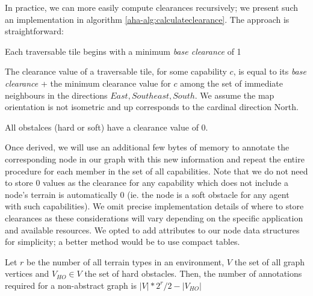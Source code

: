 
In practice, we can more easily compute clearances recursively; we present such an implementation in algorithm \ref{aha-alg:calculateclearance}. The approach is straightforward:  
\begin{definition}
Each traversable tile begins with a minimum \emph{base clearance} of 1
\end{definition}

\begin{definition}
The clearance value of a traversable tile, for some capability $c$, is equal to its \emph{base clearance} + the minimum clearance value for $c$ among the set of immediate neighbours in the directions ${East, Southeast, South}$. We assume the map orientation is not isometric and up corresponds to the cardinal direction North. 
\end{definition}

\begin{definition}
All obstalces (hard or soft) have a clearance value of 0. 
\end{definition}

Once derived, we will use an additional few bytes of memory to annotate the corresponding node in our graph with this new information and repeat the entire procedure for each member in the set of all capabilities. Note that we do not need to store 0 values as the clearance for any capability which does not include a node's terrain is automatically 0 (ie. the node is a soft obstacle for any agent with  such capabilities). We omit precise implementation details of where to store clearances as these considerations will vary depending on the specific application and available resources. We opted to add attributes to our node data structures for simplicity; a better method would be to use compact tables.




\begin{lemma}
\label{aha-lemma:numannotations}
Let $r$ be the number of all terrain types in an environment, $V$ the set of all graph vertices and $V_{HO} \in V$ the set of hard obstacles. Then, the number of annotations required for a non-abstract graph is $|V|*2^r/2 - |V_{HO}|$
\end{lemma}

